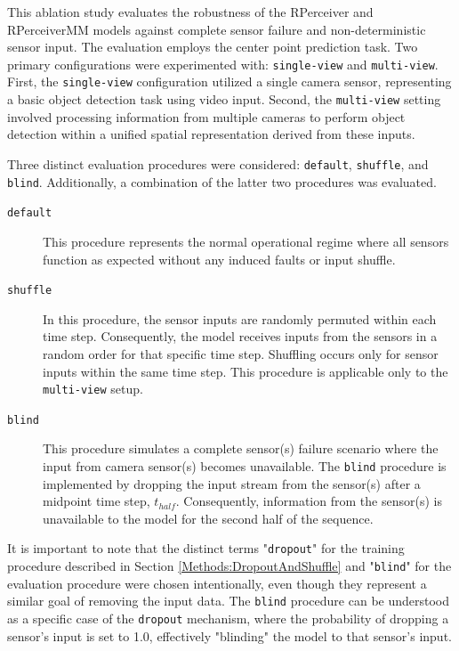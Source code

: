 This ablation study evaluates the robustness of the RPerceiver and RPerceiverMM models against complete sensor failure and non-deterministic sensor input. The evaluation employs the center point prediction task. Two primary configurations were experimented with: \texttt{single-view} and \texttt{multi-view}. First, the \texttt{single-view} configuration utilized a single camera sensor, representing a basic object detection task using video input. Second, the \texttt{multi-view} setting involved processing information from multiple cameras to perform object detection within a unified spatial representation derived from these inputs.

Three distinct evaluation procedures were considered: \texttt{default}, \texttt{shuffle}, and \texttt{blind}. Additionally, a combination of the latter two procedures was evaluated.

\begin{description}
    \item[\texttt{default}] This procedure represents the normal operational regime where all sensors function as expected without any induced faults or input shuffle.

    \item[\texttt{shuffle}] In this procedure, the sensor inputs are randomly permuted within each time step. Consequently, the model receives inputs from the sensors in a random order for that specific time step. Shuffling occurs only for sensor inputs within the same time step. This procedure is applicable only to the \texttt{multi-view} setup.

    \item[\texttt{blind}] This procedure simulates a complete sensor(s) failure scenario where the input from camera sensor(s) becomes unavailable. The \texttt{blind} procedure is implemented by dropping the input stream from the sensor(s) after a midpoint time step, $t_{half}$. Consequently, information from the sensor(s) is unavailable to the model for the second half of the sequence.
\end{description}

It is important to note that the distinct terms "\texttt{dropout}" for the training procedure described in Section \ref{Methods:DropoutAndShuffle} and "\texttt{blind}" for the evaluation procedure were chosen intentionally, even though they represent a similar goal of removing the input data. The \texttt{blind} procedure can be understood as a specific case of the \texttt{dropout} mechanism, where the probability of dropping a sensor's input is set to 1.0, effectively "blinding" the model to that sensor's input.

